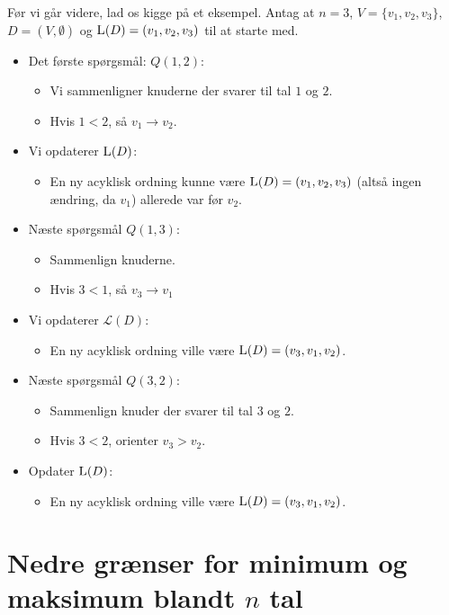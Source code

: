Før vi går videre, lad os kigge på et eksempel. Antag at $n = 3$, $V = \{v_{1}, v_{2}, v_{3}\}$, $D = (V, \emptyset)$ og $\textsc{L}(D) = (v_{1}, v_{2}, v_{3})$ til at starte med.
\begin{itemize}
	\item Det første spørgsmål: $Q(1,2)$:
	      \begin{itemize}
		      \item Vi sammenligner knuderne der svarer til tal $1$ og $2$.
		      \item Hvis $1 < 2$, så $v_{1} \rightarrow v_{2}$.
	      \end{itemize}
	\item Vi opdaterer $\textsc{L}(D)$:
	      \begin{itemize}
		      \item En ny acyklisk ordning kunne være $\textsc{L}(D) = (v_{1}, v_{2}, v_{3})$ (altså ingen ændring, da $v_{1}$) allerede var før $v_{2}$.
	      \end{itemize}
	\item Næste spørgsmål $Q(1,3)$:
	      \begin{itemize}
		      \item Sammenlign knuderne.
		      \item Hvis $3 < 1$, så $v_{3} \rightarrow v_{1}$
	      \end{itemize}
	\item Vi opdaterer $\mathcal{L}(D)$:
	      \begin{itemize}
		      \item En ny acyklisk ordning ville være $\textsc{L}(D) = (v_3, v_{1}, v_{2})$.
	      \end{itemize}
	\item Næste spørgsmål $Q(3,2)$:
	      \begin{itemize}
		      \item Sammenlign knuder der svarer til tal $3$ og $2$.
		      \item Hvis $3 < 2$, orienter $v_{3} > v_{2}$.
	      \end{itemize}

	\item Opdater $\textsc{L}(D)$:
	      \begin{itemize}
		      \item En ny acyklisk ordning ville være $\textsc{L}(D) = (v_{3}, v_{1}, v_{2})$.
	      \end{itemize}
\end{itemize}

\section{Nedre grænser for minimum og maksimum blandt $n$ tal}%
\label{sec:label}

